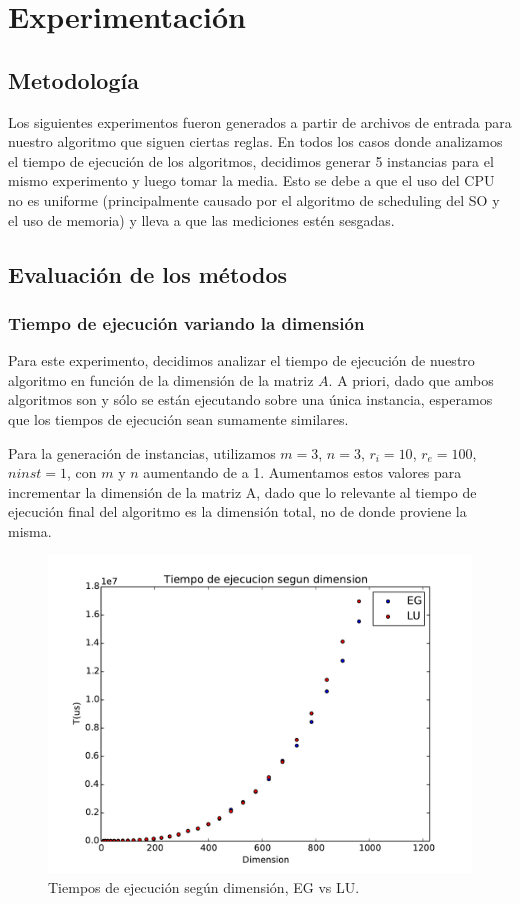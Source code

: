 \section{Experimentación}

\subsection{Metodología}

Los siguientes experimentos fueron generados a partir de archivos de entrada para nuestro algoritmo que siguen ciertas reglas. En todos los casos donde analizamos el tiempo de ejecución de los algoritmos, decidimos generar 5 instancias para el mismo experimento y luego tomar la media. Esto se debe a que el uso del CPU no es uniforme (principalmente causado por el algoritmo de scheduling del SO y el uso de memoria) y lleva a que las mediciones estén sesgadas.

\subsection{Evaluación de los métodos}

\subsubsection{Tiempo de ejecución variando la dimensión}

Para este experimento, decidimos analizar el tiempo de ejecución de nuestro algoritmo en función de la dimensión de la matriz $A$. A priori, dado que ambos algoritmos son  y sólo se están ejecutando sobre una única instancia, esperamos que los tiempos de ejecución sean sumamente similares.

Para la generación de instancias, utilizamos $m = 3$, $n = 3$, $r_i = 10$, $r_e = 100$, $ninst = 1$, con $m$ y $n$ aumentando de a 1. Aumentamos estos valores para incrementar la dimensión de la matriz A, dado que lo relevante al tiempo de ejecución final del algoritmo es la dimensión total, no de donde proviene la misma.

\begin{figure}[h]
\centering
\includegraphics[scale=0.7]{graficos/dimVariable.pdf}
\caption{Tiempos de ejecución según dimensión, EG vs LU.}
\label{timeDim}
\end{figure}

